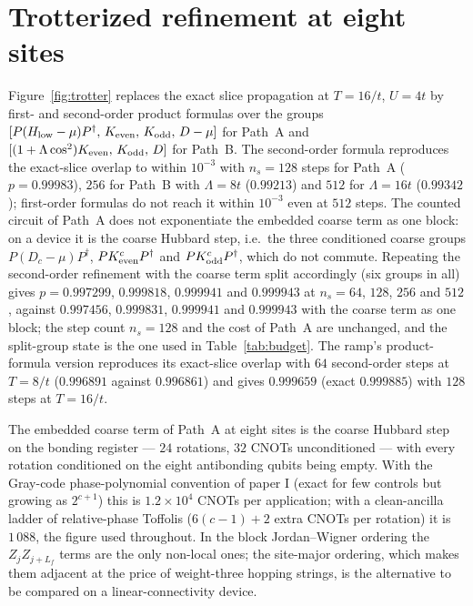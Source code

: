 \documentclass[a4paper,11pt,noarxiv]{quantumarticle}
\newcommand{\Hlow}{H_{\mathrm{low}}}
\begin{document}
\section{Trotterized refinement at eight sites}
\label{sm:trotter}
Figure~\ref{fig:trotter} replaces the exact slice propagation at $T=16/t$,
$U=4t$ by first- and second-order product formulas over the groups
$[P(\Hlow-\mu)P^\dagger,\,K_{\rm even},\,K_{\rm odd},\,D-\mu]$ for Path~A
and $[(1+\Lambda\cos^2)K_{\rm even},\,K_{\rm odd},\,D]$ for Path~B.  The
second-order formula reproduces the exact-slice overlap to within $10^{-3}$
with $n_s=128$ steps for Path~A ($p=0.99983$), $256$ for Path~B with
$\Lambda=8t$ ($0.99213$) and $512$ for $\Lambda=16t$ ($0.99342$);
first-order formulas do not reach it within $10^{-3}$ even at $512$ steps.
The counted circuit of Path~A does not exponentiate the embedded coarse
term as one block: on a device it is the coarse Hubbard step, i.e.\ the
three conditioned coarse groups $P(D_c-\mu)P^\dagger$,
$PK^c_{\rm even}P^\dagger$ and $PK^c_{\rm odd}P^\dagger$, which do not
commute.  Repeating the second-order refinement with the coarse term split
accordingly (six groups in all) gives $p=0.997299$, $0.999818$, $0.999941$
and $0.999943$ at $n_s=64$, $128$, $256$ and $512$, against $0.997456$,
$0.999831$, $0.999941$ and $0.999943$ with the coarse term as one block;
the step count $n_s=128$ and the cost of Path~A are unchanged, and the
split-group state is the one used in Table~\ref{tab:budget}.  The ramp's
product-formula version reproduces its exact-slice overlap with $64$
second-order steps at $T=8/t$ ($0.996891$ against $0.996861$) and gives
$0.999659$ (exact $0.999885$) with $128$ steps at $T=16/t$.

The embedded coarse term of Path~A at eight sites is the coarse Hubbard
step on the bonding register --- $24$ rotations, $32$ CNOTs unconditioned
--- with every rotation conditioned on the eight antibonding qubits being
empty.  With the Gray-code phase-polynomial convention of paper I (exact for
few controls but growing as $2^{c+1}$) this is $1.2\times10^4$ CNOTs per
application; with a clean-ancilla ladder of relative-phase Toffolis
($6(c-1)+2$ extra CNOTs per rotation) it is $1\,088$, the figure used
throughout.  In the block Jordan--Wigner ordering the $Z_jZ_{j+L_f}$ terms
are the only non-local ones; the site-major ordering, which makes them
adjacent at the price of weight-three hopping strings, is the alternative
to be compared on a linear-connectivity device.
\end{document}
